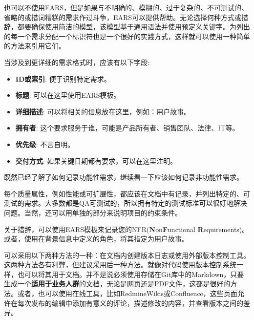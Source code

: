 也可以不使用EARS，但是如果与不明确的、模糊的、过于复杂的、不可测试的、省略的或措词糟糕的需求作过斗争，EARS可以提供帮助。无论选择何种方式或措辞，都要确保使用简洁的模型，该模型基于通用语法并使用预定义关键字。为列出的每一个需求分配一个标识符也是一个很好的实践方式，这样就可以使用一种简单的方法来引用它们。

当涉及到更详细的需求格式时，应该有以下字段:

\begin{itemize}
\item 
\textbf{ID或索引}: 便于识别特定需求。

\item 
\textbf{标题}: 可以在这里使用EARS模板。

\item 
\textbf{详细描述}: 可以将相关的信息放在这里，例如：用户故事。

\item
\textbf{拥有者}: 这个要求服务于谁，可能是产品所有者、销售团队、法律、IT等。

\item
\textbf{优先级}: 不言自明。

\item
\textbf{交付方式}: 如果关键日期都有要求，可以在这里注明。
\end{itemize}

既然已经了解了如何记录功能性需求，继续看一下应该如何记录非功能性需求。


每个质量属性，例如性能或可扩展性，都应该在文档中有记录，并列出特定的、可测试的需求。大多数都是QA可测试的，所以拥有特定的测试标准可以很好地解决问题。当然，还可以用单独的部分来说明项目的约束条件。

关于措辞，可以使用EARS模板来记录您的NFR(\textbf{N}on\textbf{F}unctional \textbf{R}equirements)。或者，使用在背景信息中定义的角色，将其指定为用户故事。


可以采用以下两种方法的一种：在文档内创建版本日志或使用外部版本控制工具。这两种方法各有利弊，但建议采用后一种方法。就像对代码使用版本控制系统一样，也可以将其用于文档。并不是说必须使用存储在Git库中的Markdown，只要生成一个\textbf{适用于业务人群}的文档，无论是网页还是PDF文件，这都是很好的方法。或者，也可以使用在线工具，比如RedmineWikis或Confluence，这些页面允许在每次发布的编辑中添加有意义的评论，描述修改的内容，并查看版本之间的差异。

